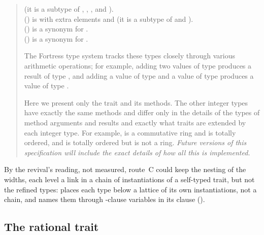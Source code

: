 \begin{description}
\begin{quote}
\begin{tabbing}
(it is a subtype of , , , and ).
\\
 () is
 with extra elements \EXP{+\infty} and \EXP{-\infty}
(it is a subtype of  and ).
\\
 () is a synonym for .
\\
 () is a synonym for .
\end{tabbing}

The Fortress type system tracks these types closely through various arithmetic
operations; for example, adding two values of type  produces a result of type ,
and adding a value of type  and a value of type  produces a value
of type .

Here we present only the trait  and its methods.
The other integer types have exactly the same methods and differ
only in the details of the types of method arguments and results
and exactly what traits are extended by each integer type.
For example,  is a commutative ring and is totally ordered,
and  is totally ordered but is not a ring.
\emph{Future versions of this specification will include
the exact details of how all this is implemented.}
\end{quote}
\item[Route C] By the revival's reading, not measured, route~C could keep the
nesting of the widths, each level a link in a chain of instantiations of a
self-typed trait, but not the refined types:  places
each type below a lattice of its own instantiations, not a chain, and names
them through -clause variables in its  clause
().
\end{description}

\subsection{The rational trait}

